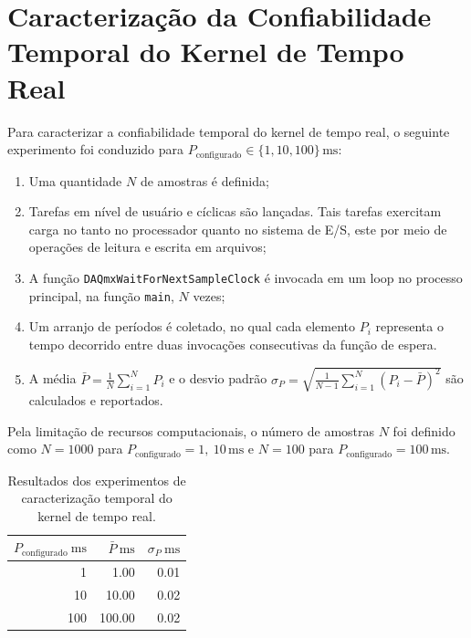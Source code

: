 \documentclass[conference,harvard,brazil,english]{sbatex}
\begin{document}
\section{Caracterização da Confiabilidade Temporal do Kernel de Tempo Real}

Para caracterizar a confiabilidade temporal do kernel de tempo real, o seguinte experimento foi conduzido para $P_\text{configurado} \in \{1,10,100\}\,\text{ms}$:

\begin{enumerate}
    \item Uma quantidade $N$ de amostras é definida;
    \item Tarefas em nível de usuário e cíclicas são lançadas. Tais tarefas exercitam carga no tanto no processador quanto no sistema de E/S, este por meio de operações de leitura e escrita em arquivos;
    \item A função \texttt{DAQmxWaitForNextSampleClock} é invocada em um loop no processo principal, na função \texttt{main}, $N$ vezes;
    \item Um arranjo de períodos é coletado, no qual cada elemento $P_i$ representa o tempo decorrido entre duas invocações consecutivas da função de espera.
    \item A média $\bar{P} = \frac{1}{N} \sum_{i=1}^N P_i$ e o desvio padrão $\sigma_P = \sqrt{\frac{1}{N - 1} \sum_{i=1}^N (P_i - \bar{P})^2}$ são calculados e reportados.
\end{enumerate}

Pela limitação de recursos computacionais, o número de amostras $N$ foi definido como $N = 1000$ para $P_\text{configurado} = 1,\ 10\, \text{ms}$ e $N = 100$ para $P_\text{configurado} = 100\,\text{ms}$.

\begin{table}[H]
    \centering
    \begin{tabular}{r r r}
        \hline
        $P_\text{configurado}\ \text{ms}$ & $\bar{P}\ \text{ms}$ & $\sigma_P\ \text{ms}$ \\
        \hline
        1                                 & 1.00                 & 0.01                  \\
        10                                & 10.00                & 0.02                  \\
        100                               & 100.00               & 0.02                  \\
        \hline
    \end{tabular}
    \caption{Resultados dos experimentos de caracterização temporal do kernel de tempo real.}
    \label{tab:resultados_temporais}
\end{table}
\end{document}
